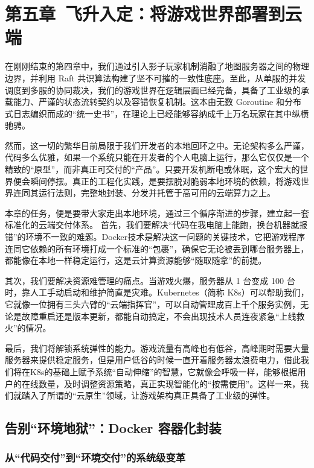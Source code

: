 \section{第五章\ 飞升入定：将游戏世界部署到云端}


在刚刚结束的第四章中，我们通过引入影子玩家机制消融了地图服务器之间的物理边界，并利用 Raft 共识算法构建了坚不可摧的一致性底座。至此，从单服的并发调度到多服的协同裁决，我们的游戏世界在逻辑层面已经完备，具备了工业级的承载能力、严谨的状态流转契约以及容错恢复机制。这本由无数 Goroutine 和分布式日志编织而成的“统一史书”，在理论上已经能够容纳成千上万名玩家在其中纵横驰骋。

然而，这一切的繁华目前局限于我们开发者的本地回环之中。无论架构多么严谨，代码多么优雅，如果一个系统只能在开发者的个人电脑上运行，那么它仅仅是一个精致的“原型”，而非真正可交付的“产品”。只要开发机断电或休眠，这个宏大的世界便会瞬间停摆。真正的工程化实践，是要摆脱对脆弱本地环境的依赖，将游戏世界连同其运行法则，完整地封装、分发并托管于高可用的云端算力之上。

本章的任务，便是要带大家走出本地环境，通过三个循序渐进的步骤，建立起一套标准化的云端交付体系。
首先，我们要解决“代码在我电脑上能跑，换台机器就报错”的环境不一致的难题。Docker技术是解决这一问题的关键技术，它把游戏程序连同它依赖的所有环境打成一个标准的“包裹”，确保它无论被丢到哪台服务器上，都能像在本地一样稳定运行，这是云计算资源能够“随取随拿”的前提。

其次，我们要解决资源难管理的痛点。当游戏火爆，服务器从 1 台变成 100 台时，靠人工手动启动和维护简直是灾难。Kubernetes（简称 K8s）可以帮助我们，它就像一位拥有三头六臂的“云端指挥官”，可以自动管理成百上千个服务实例，无论是故障重启还是版本更新，都能自动搞定，不会出现技术人员连夜紧急“上线救火”的情况。

最后，我们将解锁系统弹性的能力。游戏流量有高峰也有低谷，高峰期时需要大量服务器来提供稳定服务，但是用户低谷的时候一直开着服务器太浪费电力，借此我们将在K8s的基础上赋予系统“自动伸缩”的智慧，它就像会呼吸一样，能够根据用户的在线数量，及时调整资源策略，真正实现智能化的“按需使用”。这样一来，我们就踏入了所谓的“云原生”领域，让游戏架构真正具备了工业级的弹性。

\subsection{告别“环境地狱”：Docker 容器化封装}

\subsubsection{从“代码交付”到“环境交付”的系统级变革}

